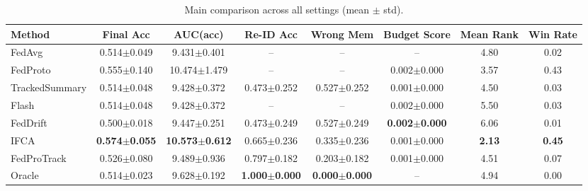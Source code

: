 \begin{table}[t]
\centering
\caption{Main comparison across all settings (mean $\pm$ std).}
\label{tab:main}
\begin{tabular}{lccccccc}
\toprule
Method & Final Acc & AUC(acc) & Re-ID Acc & Wrong Mem & Budget Score & Mean Rank & Win Rate \\
\midrule
FedAvg & 0.514$\pm$0.049 & 9.431$\pm$0.401 & -- & -- & -- & 4.80 & 0.02 \\
FedProto & 0.555$\pm$0.140 & 10.474$\pm$1.479 & -- & -- & 0.002$\pm$0.000 & 3.57 & 0.43 \\
TrackedSummary & 0.514$\pm$0.048 & 9.428$\pm$0.372 & 0.473$\pm$0.252 & 0.527$\pm$0.252 & 0.001$\pm$0.000 & 4.50 & 0.03 \\
Flash & 0.514$\pm$0.048 & 9.428$\pm$0.372 & -- & -- & 0.002$\pm$0.000 & 5.50 & 0.03 \\
FedDrift & 0.500$\pm$0.018 & 9.447$\pm$0.251 & 0.473$\pm$0.249 & 0.527$\pm$0.249 & \textbf{0.002$\pm$0.000} & 6.06 & 0.01 \\
IFCA & \textbf{0.574$\pm$0.055} & \textbf{10.573$\pm$0.612} & 0.665$\pm$0.236 & 0.335$\pm$0.236 & 0.001$\pm$0.000 & \textbf{2.13} & \textbf{0.45} \\
FedProTrack & 0.526$\pm$0.080 & 9.489$\pm$0.936 & 0.797$\pm$0.182 & 0.203$\pm$0.182 & 0.001$\pm$0.000 & 4.51 & 0.07 \\
Oracle & 0.514$\pm$0.023 & 9.628$\pm$0.192 & \textbf{1.000$\pm$0.000} & \textbf{0.000$\pm$0.000} & -- & 4.94 & 0.00 \\
\bottomrule
\end{tabular}
\end{table}